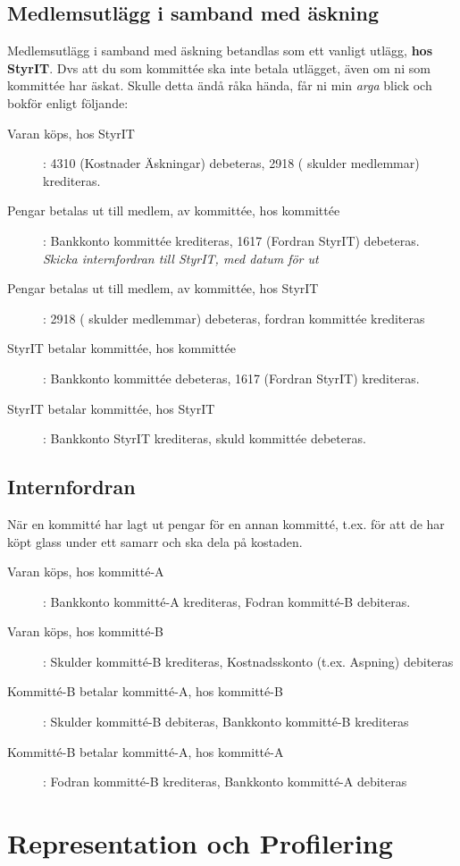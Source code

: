 \documentclass{article}
\begin{document}
\subsection{Medlemsutlägg i samband med äskning}
Medlemsutlägg i samband med äskning betandlas som ett vanligt utlägg, \textbf{hos StyrIT}. Dvs att du som kommittée ska inte betala utlägget, även om ni som kommittée har äskat. Skulle detta ändå råka hända, får ni min \textit{arga} blick och bokför enligt följande: 
\begin{description}
    \item [Varan köps, hos StyrIT]: 4310 (Kostnader Äskningar) debeteras, 2918 ( skulder medlemmar) krediteras.
    \item [Pengar betalas ut till medlem, av kommittée, hos kommittée]: Bankkonto kommittée krediteras, 1617 (Fordran StyrIT) debeteras. \textit{Skicka internfordran till StyrIT, med datum för ut}
    \item [Pengar betalas ut till medlem, av kommittée, hos StyrIT]: 2918 ( skulder medlemmar) debeteras, fordran kommittée krediteras
    \item [StyrIT betalar kommittée, hos kommittée] : Bankkonto kommittée debeteras, 1617 (Fordran StyrIT) krediteras.
    \item [StyrIT betalar kommittée, hos StyrIT] : Bankkonto StyrIT krediteras,  skuld kommittée debeteras.
\end{description}


\subsection{Internfordran}
När en kommitté har lagt ut pengar för en annan kommitté, t.ex. för att de har köpt glass under ett samarr och ska dela på kostaden.
\begin{description}
   \item [Varan köps, hos kommitté-A]: Bankkonto kommitté-A krediteras, Fodran kommitté-B debiteras.
   \item [Varan köps, hos kommitté-B]: Skulder kommitté-B krediteras, Kostnadsskonto (t.ex. Aspning) debiteras
   \item [Kommitté-B betalar kommitté-A, hos kommitté-B]: Skulder kommitté-B debiteras, Bankkonto kommitté-B krediteras
   \item [Kommitté-B betalar kommitté-A, hos kommitté-A]: Fodran kommitté-B krediteras, Bankkonto kommitté-A debiteras
\end{description}

\section{Representation och Profilering}
\end{document}
